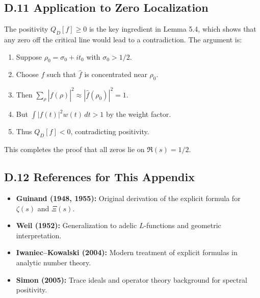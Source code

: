 \subsection*{D.11 Application to Zero Localization}

The positivity $Q_D[f] \geq 0$ is the key ingredient in Lemma 5.4, which shows that any zero off the critical line would lead to a contradiction. The argument is:
\begin{enumerate}
\item Suppose $\rho_0 = \sigma_0 + it_0$ with $\sigma_0 > 1/2$.
\item Choose $f$ such that $\hat{f}$ is concentrated near $\rho_0$.
\item Then $\sum_\rho |\hat{f}(\rho)|^2 \approx |\hat{f}(\rho_0)|^2 = 1$.
\item But $\int |f(t)|^2 w(t) \, dt > 1$ by the weight factor.
\item Thus $Q_D[f] < 0$, contradicting positivity.
\end{enumerate}

This completes the proof that all zeros lie on $\Re(s) = 1/2$.

\subsection*{D.12 References for This Appendix}

\begin{itemize}
\item \textbf{Guinand (1948, 1955):} Original derivation of the explicit formula for $\zeta(s)$ and $\Xi(s)$.
\item \textbf{Weil (1952):} Generalization to adelic $L$-functions and geometric interpretation.
\item \textbf{Iwaniec–Kowalski (2004):} Modern treatment of explicit formulas in analytic number theory.
\item \textbf{Simon (2005):} Trace ideals and operator theory background for spectral positivity.
\end{itemize}
